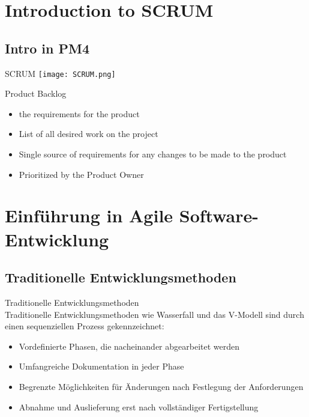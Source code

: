 \section{Introduction to SCRUM}

\subsection{Intro in PM4}

\begin{concept}{SCRUM}
    \texttt{[image: SCRUM.png]}
\end{concept}

\begin{definition}{Product Backlog}
    \begin{itemize}
        \item the requirements for the product
        \item List of all desired work on the project
        \item Single source of requirements for any changes to be made to the product
        \item Prioritized by the Product Owner
    \end{itemize}
\end{definition}

\section{Einführung in Agile Software-Entwicklung}

\subsection{Traditionelle Entwicklungsmethoden}

\begin{definition}{Traditionelle Entwicklungsmethoden}\\
    Traditionelle Entwicklungsmethoden wie Wasserfall und das V-Modell sind durch einen sequenziellen Prozess gekennzeichnet:
    \begin{itemize}
        \item Vordefinierte Phasen, die nacheinander abgearbeitet werden
        \item Umfangreiche Dokumentation in jeder Phase
        \item Begrenzte Möglichkeiten für Änderungen nach Festlegung der Anforderungen
        \item Abnahme und Auslieferung erst nach vollständiger Fertigstellung
    \end{itemize}
\end{definition}

